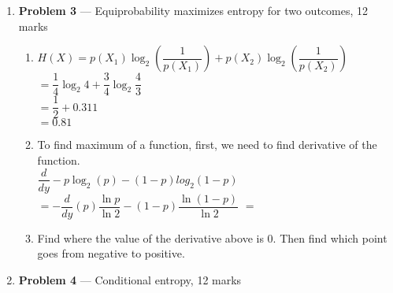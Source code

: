 \documentclass[11pt]{article}
\theoremstyle{definition}
\begin{document}
\begin{enumerate}
	
	\newpage
	\item[] \textbf{Problem 3} --- Equiprobability maximizes entropy for two outcomes, 12 marks
	
	
	\begin{enumerate}
		\item 
		$H(X) = p(X_{1}) \log_{2}(\dfrac{1}{p(X_{1})}) + p(X_{2})\log_{2}(\dfrac{1}{p(X_{2})})$\\
		$= \dfrac{1}{4} \log_{2} 4 + \dfrac{3}{4} \log_{2} \dfrac{4}{3}$\\
		$= \dfrac{1}{2} + 0.311$\\
		$= 0.81$
		\item To find maximum of a function, first, we need to find derivative of the function.\\
		$\dfrac{d}{dy} -p \log_{2}(p)-(1-p)log_{2}(1-p)$\\
		$ =- \dfrac{d}{dy} (p) \dfrac{\ln p}{\ln 2} - (1-p)\dfrac{\ln (1-p)}{\ln 2} $
		$ = $
		
		
		
		\item  Find where the value of the derivative above is 0. Then find which point goes from negative to positive. 
	
	\end{enumerate}
	
	\newpage
	\item[] \textbf{Problem 4} --- Conditional entropy, 12 marks
		

\end{enumerate}
\end{document}

